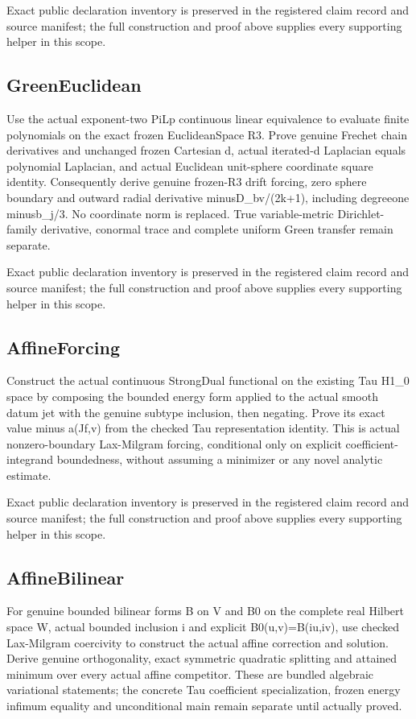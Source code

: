 \documentclass[11pt]{article}
\theoremstyle{definition}
\theoremstyle{remark}
\numberwithin{equation}{section}
\begin{document}
Exact public declaration inventory is preserved in the registered claim record and source manifest; the full construction and proof above supplies every supporting helper in this scope.

\subsection{GreenEuclidean}
\label{daytime-v010:greeneuclidean}
Use the actual exponent-two PiLp continuous linear equivalence to evaluate finite polynomials on the exact frozen EuclideanSpace R3. Prove genuine Frechet chain derivatives and unchanged frozen Cartesian d, actual iterated-d Laplacian equals polynomial Laplacian, and actual Euclidean unit-sphere coordinate square identity. Consequently derive genuine frozen-R3 drift forcing, zero sphere boundary and outward radial derivative minusD\_bv/(2k+1), including degreeone minusb\_j/3. No coordinate norm is replaced. True variable-metric Dirichlet-family derivative, conormal trace and complete uniform Green transfer remain separate.

Exact public declaration inventory is preserved in the registered claim record and source manifest; the full construction and proof above supplies every supporting helper in this scope.

\subsection{AffineForcing}
\label{daytime-v010:affineforcing}
Construct the actual continuous StrongDual functional on the existing Tau H1\_0 space by composing the bounded energy form applied to the actual smooth datum jet with the genuine subtype inclusion, then negating. Prove its exact value minus a(Jf,v) from the checked Tau representation identity. This is actual nonzero-boundary Lax-Milgram forcing, conditional only on explicit coefficient-integrand boundedness, without assuming a minimizer or any novel analytic estimate.

Exact public declaration inventory is preserved in the registered claim record and source manifest; the full construction and proof above supplies every supporting helper in this scope.

\subsection{AffineBilinear}
\label{daytime-v010:affinebilinear}
For genuine bounded bilinear forms B on V and B0 on the complete real Hilbert space W, actual bounded inclusion i and explicit B0(u,v)=B(iu,iv), use checked Lax-Milgram coercivity to construct the actual affine correction and solution. Derive genuine orthogonality, exact symmetric quadratic splitting and attained minimum over every actual affine competitor. These are bundled algebraic variational statements; the concrete Tau coefficient specialization, frozen energy infimum equality and unconditional main remain separate until actually proved.
\end{document}
